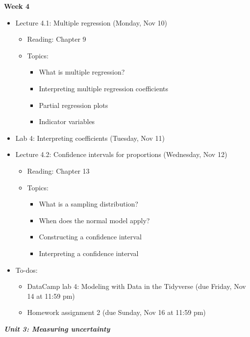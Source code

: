 \documentclass[11pt]{article}
\begin{document}
\textbf{Week 4}
\begin{itemize}
    \item Lecture 4.1: Multiple regression (Monday, Nov 10)
    \begin{itemize}
        \item Reading: Chapter 9
        \item Topics: 
        \begin{itemize}
            \item What is multiple regression?
            \item Interpreting multiple regression coefficients
            \item Partial regression plots
            \item Indicator variables
        \end{itemize}
    \end{itemize}
    \item Lab 4: Interpreting coefficients (Tuesday, Nov 11)
    \item Lecture 4.2: Confidence intervals for proportions (Wednesday, Nov 12)
    \begin{itemize}
        \item Reading: Chapter 13
        \item Topics:
        \begin{itemize}
            \item What is a sampling distribution?
            \item When does the normal model apply?
            \item Constructing a confidence interval
            \item Interpreting a confidence interval
        \end{itemize}
    \end{itemize}
    \item To-dos:
    \begin{itemize}
        \item DataCamp lab 4: Modeling with Data in the Tidyverse (due Friday, Nov 14 at 11:59 pm)
        \item Homework assignment 2 (due Sunday, Nov 16 at 11:59 pm)
    \end{itemize}
\end{itemize}




\Large \textit{\textbf{Unit 3: Measuring uncertainty}} \\
\end{document}
